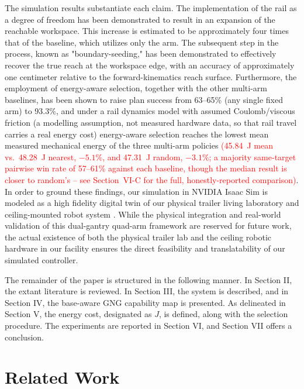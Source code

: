 \documentclass[conference]{IEEEtran}
\begin{document}
The simulation results substantiate each claim. The implementation of the rail as 
a degree of freedom has been demonstrated to result in an expansion of the reachable 
workspace. This increase is estimated to be approximately four times that of the baseline, 
which utilizes only the arm. The subsequent step in the process, known as "boundary-seeding," 
has been demonstrated to effectively recover the true reach at the workspace edge, 
with an accuracy of approximately one centimeter relative to the forward-kinematics 
reach surface. Furthermore, the employment of energy-aware
selection, together with the other multi-arm baselines, has been shown to raise
plan success from 63--65\% (any single fixed arm) to 93.3\%, and under a rail
dynamics model with assumed Coulomb/viscous friction (a modelling assumption,
not measured hardware data, so that rail travel carries a real energy cost)
energy-aware selection reaches the lowest mean measured mechanical energy of the
three multi-arm policies \textcolor{red}{(45.84~J mean vs.\ 48.28~J nearest,
$-5.1\%$, and 47.31~J random, $-3.1\%$; a majority same-target pairwise win rate
of 57--61\% against each baseline, though the median result is closer to
random's -- see Section~VI-C for the full, honestly-reported comparison)}. In
order to ground these findings, our simulation in NVIDIA Isaac Sim \cite{IsaacSim2026}
is modeled as a high fidelity digital twin of our physical trailer living laboratory 
and ceiling-mounted robot system \cite{Kubota2022}. 
While the physical integration and real-world validation of this dual-gantry quad-arm 
framework are reserved for future work, the actual existence of both the physical 
trailer lab and the ceiling robotic hardware in our facility ensures the direct 
feasibility and translatability of our simulated controller.

The remainder of the paper is structured in the following manner. In Section II, 
the extant literature is reviewed. In Section III, the system is described, and 
in Section IV, the base-aware GNG capability map is presented. As delineated in Section V, 
the energy cost, designated as $J$, is defined, along with the selection procedure. 
The experiments are reported in Section VI, and Section VII offers a conclusion.

\section{Related Work}
\end{document}
